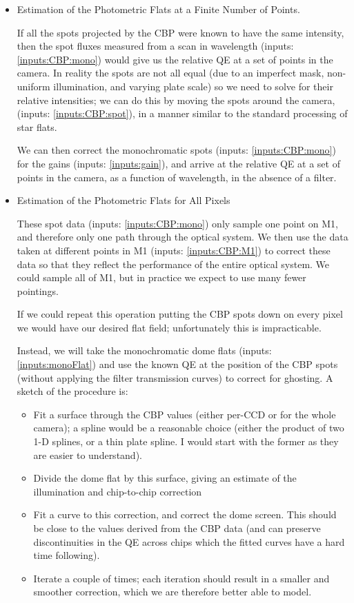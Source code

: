 \documentclass[12pt]{article}
\newcommand{\inputData}[1]{(inputs: \ref{inputs:#1})}
\begin{document}
\begin{itemize}
\item Estimation of the Photometric Flats at a Finite Number of Points.

  If all the spots projected by the CBP were known to have the same intensity, then the spot fluxes measured
  from a scan in wavelength \inputData{CBP:mono} would give us the relative QE at a set of points in the
  camera.  In reality the spots are not all equal (due to an imperfect mask, non-uniform illumination, and
  varying plate scale) so we need to solve for their relative intensities; we can do this by moving the spots
  around the camera, \inputData{CBP:spot}, in a manner similar to the standard processing of star flats.

  We can then correct the monochromatic spots \inputData{CBP:mono} for the gains \inputData{gain}, and arrive
  at the relative QE at a set of points in the camera, as a function of wavelength, in the absence of a
  filter.

\item Estimation of the Photometric Flats for All Pixels

  These spot data \inputData{CBP:mono} only sample one point on M1, and therefore only one path
  through the optical system.  We then use the data taken at different points in M1 \inputData{CBP:M1}
  to correct these data so that they reflect the performance of the entire optical system.  We
  could sample all of M1, but in practice we expect to use many fewer pointings.

  If we could repeat this operation putting the CBP spots down on every pixel we would have our
  desired flat field;  unfortunately this is impracticable.

  Instead, we will take the monochromatic dome flats \inputData{monoFlat} and use the known QE at the position
  of the CBP spots (without applying the filter transmission curves) to correct for ghosting.  A sketch
  of the procedure is:
  \begin{itemize}
  \item Fit a surface through the CBP values (either per-CCD or for the whole camera); a spline would
    be a reasonable choice (either the product of two 1-D splines, or a thin plate spline.  I would
    start with the former as they are easier to understand).
  \item Divide the dome flat by this surface, giving an estimate of the illumination and chip-to-chip
    correction
  \item Fit a curve to this correction, and correct the dome screen.  This should be close to the
    values derived from the CBP data (and can preserve discontinuities in the QE across chips which
    the fitted curves have a hard time following).
  \item Iterate a couple of times;  each iteration should result in a smaller and smoother correction,
    which we are therefore better able to model.
  \end{itemize}


\end{itemize}
\end{document}
